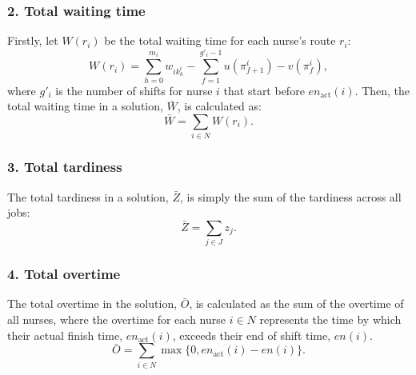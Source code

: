 \documentclass[a4paper,11pt,authoryear]{elsarticle}
\begin{document}
\subsubsection*{2. Total waiting time}
\noindent Firstly, let $W(r_i)$ be the total waiting time for each nurse's route $r_i$:
\begin{equation}
	W(r_i) = \displaystyle\sum_{h=0}^{m_i} w_{i k_{h}^i} - \displaystyle\sum_{f=1}^{g'_i - 1} u(\pi_{f+1}^i) - v(\pi_f^i), \label{eq:waitingtimenurse}
\end{equation}
\noindent where $g'_i$ is the number of shifts for nurse $i$ that start before $en_{\text{act}}(i)$. Then, the total waiting time in a solution, $\bar{W}$, is calculated as:
\begin{equation}
     \bar{W} = \sum_{i \in N} W(r_i). \label{eq:totalwaitingtime}
\end{equation}

\subsubsection*{3. Total tardiness}
\noindent The total tardiness in a solution, $\bar{Z}$, is simply the sum of the tardiness across all jobs:
\begin{equation}
    \bar{Z} = \sum_{j \in J} z_j. \label{eq:totaltardiness}
\end{equation}

\subsubsection*{4. Total overtime}
\noindent The total overtime in the solution, $\bar{O}$, is calculated as the sum of the overtime of all nurses, where the overtime for each nurse $i \in N$ represents the time by which their actual finish time, $en_{\text{act}}(i)$, exceeds their end of shift time, $en(i)$. 
\begin{equation}
     \bar{O} = \sum_{i \in N} \max \{0, en_{\text{act}}(i) - en(i)\}. \label{eq:totalovertime}
\end{equation}


\end{document}
